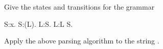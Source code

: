 Give the states and transitions for the grammar
\begin{bnf}
S:x.
S:(L).
L:S.
L:L S.
\end{bnf}
Apply the above parsing algorithm to the string .
